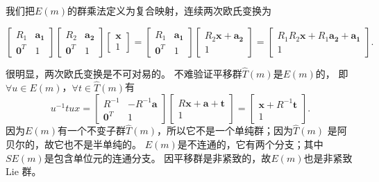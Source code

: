 我们把$E(m)$的群乘法定义为复合映射，连续两次欧氏变换为
\begin{small}

\begin{equation}\label{chlg:eqn_Emtimes}
    \begin{bmatrix}  R_1 & \boldsymbol{a_1} \\ \boldsymbol{0}^T & 1  \end{bmatrix}
    \begin{bmatrix}  R_2 & \boldsymbol{a_2} \\ \boldsymbol{0}^T & 1  \end{bmatrix}
    \begin{bmatrix}  \boldsymbol{x} \\ 1 \end{bmatrix} 
    =\begin{bmatrix}  R_1 & \boldsymbol{a_1} \\ \boldsymbol{0}^T & 1  \end{bmatrix}
    \begin{bmatrix}  R_2\boldsymbol{x} + \boldsymbol{a_2} \\  1  \end{bmatrix}
    =\begin{bmatrix}  R_1 R_2\boldsymbol{x} + R_1 \boldsymbol{a_2} +\boldsymbol{a_1} \\  1  \end{bmatrix}.
\end{equation}
\end{small}
很明显，两次欧氏变换是不可对易的。
不难验证平移群$\hat{T}(m)$是$E(m)$的，
即$\forall u \in E(m)$，$\forall t \in \hat{T}(m)$有
\begin{equation}
    u^{-1} t u x= 
    \begin{bmatrix}  R^{-1} & -R^{-1} \boldsymbol{a} \\ \boldsymbol{0}^T & 1    \end{bmatrix}
    \begin{bmatrix}  R\boldsymbol{x} + \boldsymbol{a} +  \boldsymbol{t}\\  1  \end{bmatrix}
    =\begin{bmatrix} \boldsymbol{x} + R^{-1} \boldsymbol{t}\\  1  \end{bmatrix}.
\end{equation}
因为$E(m)$有一个不变子群$\hat{T}(m)$，所以它不是一个单纯群；因为$\hat{T}(m)$
是阿贝尔的，故它也不是半单纯的。
$E(m)$是不连通的，它有两个分支；其中$SE(m)$是包含单位元的连通分支。
因平移群是非紧致的，故$E(m)$也是非紧致 Lie 群。

